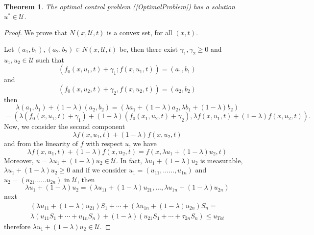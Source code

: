 \documentclass[a4paper,10pt]{article}
\newtheorem{thm}{Theorem}[section]
\theoremstyle{remark}
\begin{document}
\begin{thm}
The optimal control problem (\ref{OptimalProblem}) has a solution $ u^{*} \in \mathscr{U}$.
\end{thm}
\begin{proof}
We prove that $N(x, \mathscr{U}, t)$ is a convex set, for all $(x,t)$. 

Let 
$\left(a_{1}, b_{1}\right), \left(a_{2}, b_{2}\right) \in N\left(x, \mathscr{U}, t\right)$ be, then there exist $\gamma_{1}, \gamma_{2} \geq 0$ and $ u_{1},  u_2 \in  \mathscr{U}$ such that 
$$
\left(f_{0}\left(x,  u_{1}, t\right)+\gamma_{1} ; f\left(x,  u_{1}, t\right)\right)=\left(a_{1}, b_{1}\right) 
$$
and
$$
\left(f_{0}\left(x,  u_{2}, t\right)+\gamma_{2}, f\left(x,  u_{2}, t\right)\right)=\left(a_{2}, b_{2}\right)
$$
then 
$$
\lambda\left(a_{1}, b_{1}\right)+(1-\lambda)\left(a_{2}, b_{2}\right)=\left(\lambda a_1+(1-\lambda) a_{2}, \lambda b_{1}+(1-\lambda) b_{2}\right)
$$
$$
=\left(\lambda\left(f_{0}\left(x,  u_{1}, t\right)+\gamma_{1}\right)+(1-\lambda)\left(f_{0}\left(x_{1},  u_{2}, t\right)+\gamma_{2}\right), \lambda f\left(x,  u_{1}, t\right)+(1-\lambda) f\left(x, u_{2}, t\right)\right).
$$
Now, we consider the second component
$$
\lambda f\left(x,  u_{1}, t\right)+(1-\lambda) f\left(x,  u_{2}, t\right)
$$
and from the linearity of $f$ with respect $ u$, we have 
\[\lambda f\left(x,  u_{1}, t\right)+(1-\lambda) f\left(x,  u_{2}, t\right)=f\left(x, \lambda  u_{1}+(1-\lambda)  u_{2}, t\right)\]
Moreover, $\overline{ u}=\lambda  u_{1}+(1-\lambda)  u_{2} \in \mathscr{U}$. In fact, $\lambda  u_{1}+(1-\lambda)  u_{2}$ is measurable, $\lambda  u_{1}+(1-\lambda)  u_{2} \geqslant 0$ and if we consider
$ u_{1}=\left( u_{11}, \ldots \ldots,  u_{1 n}\right)$ and $  u_{2}=\left( u_{21} \ldots \ldots  u_{2 n}\right)$ in $\mathscr{U}$, then
\[
\lambda  u_{1}+(1-\lambda)  u_{2}=\left(\lambda  u_{11}+(1-\lambda)  u_{21}, \ldots,\lambda  u_{1 n}+(1-\lambda)  u_{2 n}\right)
\]
next
$$
\begin{array}{l}
\left(\lambda  u_{11}+(1-\lambda)  u_{21}\right)S_{1}+\cdots+\left(\lambda  u_{1n}+(1-\lambda)  u_{2n}\right)S_{n}=\\
\lambda\left( u_{11}S_{1}+\cdots+ u_{1 n}S_{n}\right)+(1-\lambda)\left( u_{21}S_{1}+\cdots+\tau_{2 n}S_{n}\right)\leq { u}_{Tot}
\end{array}
$$
therefore $\lambda  u_{1}+(1-\lambda)  u_{2}\in \mathscr{U}$.


\end{proof}
\end{document}
